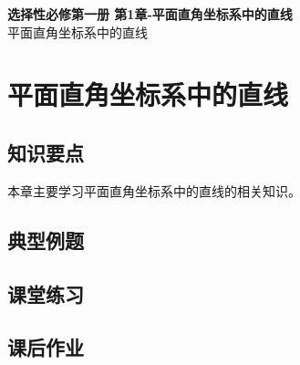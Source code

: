 \documentclass[12pt,a4paper]{article}
\begin{document}
\begin{center}
\LARGE\textbf{选择性必修第一册 第1章-平面直角坐标系中的直线} \\[0.5em]
\large 平面直角坐标系中的直线
\end{center}

\tableofcontents
\newpage

\section{平面直角坐标系中的直线}

\subsection{知识要点}
本章主要学习平面直角坐标系中的直线的相关知识。

\subsection{典型例题}

\subsection{课堂练习}

\subsection{课后作业}
\end{document}
